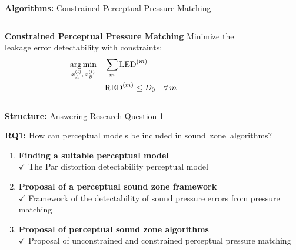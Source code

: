 \documentclass[aspectratio=169]{beamer}
\begin{document}
\begin{frame}{\textbf{Algorithms:} Constrained Perceptual Pressure Matching}
    \begin{columns}[c]
        \centering
        \begin{block}{\textbf{Constrained Perceptual Pressure Matching}}
            Minimize the leakage error detectability with constraints: 
            \begin{equation}
                \begin{aligned}
                    \operatorname*{arg\,min}_{x_A^{(l)},\,x_B^{(l)}}\quad &\sum_m \text{LED}^{(m)}\\
                    &\text{RED}^{(m)} \leq D_0 \quad\forall\,m
                \end{aligned}
            \end{equation}
        \end{block}
        \begin{figure}[]
            \centering
            \vspace{-13pt}
            \scalebox{0.6}{}
        \end{figure}
    \end{columns}
\end{frame}

\begin{frame}{\textbf{Structure:} Answering Research Question 1}
    \begin{block}{\textbf{RQ1:} How can perceptual models be included in sound~zone~algorithms?}
        \begin{enumerate}
            \item \textbf{Finding a suitable perceptual model}
                \\{{$\mathbf{\checkmark}$} The Par distortion detectability perceptual model}\vspace{3pt}
            \item \textbf{Proposal of a perceptual sound zone framework}
                \\{{$\mathbf{\checkmark}$} Framework of the detectability of sound pressure errors from pressure matching}\vspace{3pt}
            \item \textbf{Proposal of perceptual sound zone algorithms}
                \\{$\mathbf{\checkmark}$} Proposal of unconstrained and constrained perceptual pressure matching\vspace{3pt}
        \end{enumerate}
    \end{block}
\end{frame}
\end{document}
